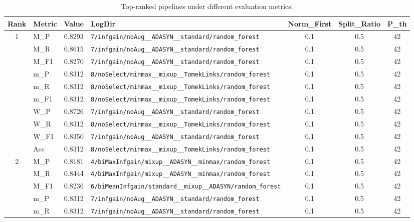 \begin{table}[htbp]
\caption{Top-ranked pipelines under different evaluation metrics.}
\label{tab:rank_metric_vertical}
\centering
\small
\setlength{\tabcolsep}{4pt}
\begin{tabular}{|c|l|c|>{\ttfamily\footnotesize}p{7.2cm}|c|c|c|}
\hline
Rank & Metric & Value & LogDir & Norm\_First & Split\_Ratio & P\_th \\
\hline
\multirow{10}{*}{1} & M\_P & 0.8293 & \texttt{7/infgain/noAug\_\_ADASYN\_\_standard/random\_forest} & 0.1 & 0.5  & 42 \\ 
 & M\_R & 0.8615 & \texttt{7/infgain/noAug\_\_ADASYN\_\_standard/random\_forest} & 0.1 & 0.5  & 42 \\ 
 & M\_F1 & 0.8270 & \texttt{7/infgain/noAug\_\_ADASYN\_\_standard/random\_forest} & 0.1 & 0.5  & 42 \\ 
 & m\_P & 0.8312 & \texttt{8/noSelect/minmax\_\_mixup\_\_TomekLinks/random\_forest} & 0.1 & 0.5  & 42 \\ 
 & m\_R & 0.8312 & \texttt{8/noSelect/minmax\_\_mixup\_\_TomekLinks/random\_forest} & 0.1 & 0.5  & 42 \\ 
 & m\_F1 & 0.8312 & \texttt{8/noSelect/minmax\_\_mixup\_\_TomekLinks/random\_forest} & 0.1 & 0.5  & 42 \\ 
 & W\_P & 0.8726 & \texttt{7/infgain/noAug\_\_ADASYN\_\_standard/random\_forest} & 0.1 & 0.5  & 42 \\ 
 & W\_R & 0.8312 & \texttt{8/noSelect/minmax\_\_mixup\_\_TomekLinks/random\_forest} & 0.1 & 0.5  & 42 \\ 
 & W\_F1 & 0.8350 & \texttt{7/infgain/noAug\_\_ADASYN\_\_standard/random\_forest} & 0.1 & 0.5  & 42 \\ 
 & Acc & 0.8312 & \texttt{8/noSelect/minmax\_\_mixup\_\_TomekLinks/random\_forest} & 0.1 & 0.5  & 42 \\ 
\hline
\multirow{10}{*}{2} & M\_P & 0.8181 & \texttt{4/biMaxInfgain/mixup\_\_ADASYN\_\_minmax/random\_forest} & 0.1 & 0.5  & 42 \\ 
 & M\_R & 0.8444 & \texttt{4/biMaxInfgain/mixup\_\_ADASYN\_\_minmax/random\_forest} & 0.1 & 0.5  & 42 \\ 
 & M\_F1 & 0.8236 & \texttt{6/biMeanInfgain/standard\_\_mixup\_\_ADASYN/random\_forest} & 0.1 & 0.5  & 42 \\ 
 & m\_P & 0.8312 & \texttt{7/infgain/noAug\_\_ADASYN\_\_standard/random\_forest} & 0.1 & 0.5  & 42 \\ 
 & m\_R & 0.8312 & \texttt{7/infgain/noAug\_\_ADASYN\_\_standard/random\_forest} & 0.1 & 0.5  & 42 \\ 

\end{tabular}
\end{table}
